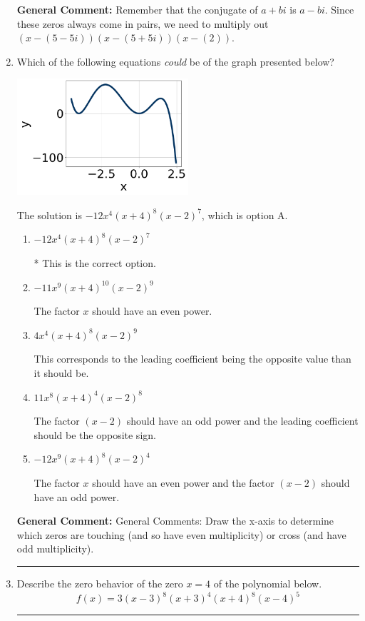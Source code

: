 \documentclass{extbook}[14pt]
\newcommand{\litem}[1]{\item #1

\rule{\textwidth}{0.4pt}}
\begin{document}
\begin{enumerate}
{\textbf{General Comment:} Remember that the conjugate of $a+bi$ is $a-bi$. Since these zeros always come in pairs, we need to multiply out $(x-(5 - 5 i))(x-(5 + 5 i))(x-(2))$.
}
\litem{
Which of the following equations \textit{could} be of the graph presented below?

\begin{center}
    \includegraphics[width=0.5\textwidth]{../Figures/polyGraphToFunctionCopyB.png}
\end{center}




The solution is \( -12x^{4} (x + 4)^{8} (x - 2)^{7} \), which is option A.\begin{enumerate}[label=\Alph*.]
\item \( -12x^{4} (x + 4)^{8} (x - 2)^{7} \)

* This is the correct option.
\item \( -11x^{9} (x + 4)^{10} (x - 2)^{9} \)

The factor $x$ should have an even power.
\item \( 4x^{4} (x + 4)^{8} (x - 2)^{9} \)

This corresponds to the leading coefficient being the opposite value than it should be.
\item \( 11x^{8} (x + 4)^{4} (x - 2)^{8} \)

The factor $(x - 2)$ should have an odd power and the leading coefficient should be the opposite sign.
\item \( -12x^{9} (x + 4)^{8} (x - 2)^{4} \)

The factor $x$ should have an even power and the factor $(x - 2)$ should have an odd power.
\end{enumerate}

\textbf{General Comment:} General Comments: Draw the x-axis to determine which zeros are touching (and so have even multiplicity) or cross (and have odd multiplicity).
}
\litem{
Describe the zero behavior of the zero $x = 4$ of the polynomial below.
\[ f(x) = 3(x - 3)^{8}(x + 3)^{4}(x + 4)^{8}(x - 4)^{5} \]

}
\end{enumerate}
\end{document}
